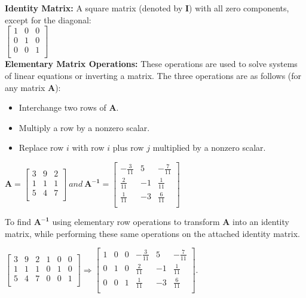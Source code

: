 {\bf Identity Matrix:} A square matrix (denoted by $\mathbf{I}$) with all zero components, except for the diagonal: \\
$\left[ \begin{array}{ccc}
     1 & 0 & 0 \\
     0 & 1 & 0 \\
     0 & 0 & 1 \\
\end{array} \right]$ \\


{\bf Elementary Matrix Operations:}
These operations are used to solve systems of linear equations or inverting a matrix. The three operations are as follows (for any matrix $\mathbf{A}$):

\begin{itemize}
\item Interchange two rows of $\mathbf{A}$.
\item Multiply a row by a nonzero scalar.
\item Replace row $i$ with row $i$ plus row $j$ multiplied by a nonzero scalar.
\end{itemize}


\bigskip $\mathbf{A} = \left[
   \begin{array}{ccc}
     3 & 9 & 2 \\
     1 & 1 & 1 \\
     5 & 4 & 7 \\
   \end{array} \right]~and~\mathbf{A^{-1}} = \left[
   \begin{array}{ccc}
     -\frac{3}{11} & 5 & -\frac{7}{11} \\
     \frac{2}{11} & -1 & \frac{1}{11} \\
     \frac{1}{11} & -3 & \frac{6}{11} \\
   \end{array} \right]$

\bigskip To find $\mathbf{A^{-1}}$ using elementary row operations to transform $\mathbf{A}$ into an identity matrix, while performing these same operations on the attached identity matrix.

\bigskip $\left[ \begin{array}{ccc|ccc} \nonumber
         3 & 9 & 2 & 1 & 0 & 0 \\
         1 & 1 & 1 & 0 & 1 & 0 \\
         5 & 4 & 7 & 0 & 0 & 1 \\
\end{array} \right] \Rightarrow
\left[ \begin{array}{ccc|ccc} \nonumber
         1 & 0 & 0 & -\frac{3}{11} & 5 & -\frac{7}{11} \\
         0 & 1 & 0 & \frac{2}{11} & -1 & \frac{1}{11} \\
         0 & 0 & 1 & \frac{1}{11} & -3 & \frac{6}{11} \\
\end{array} \right].$ \\

